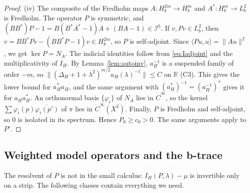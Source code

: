 \documentclass[11pt,oneside,reqno]{article}
\newcommand{\Ib}{\mathcal I^b}
\theoremstyle{plain}
\theoremstyle{definition}
\theoremstyle{remark}
\begin{document}
\begin{proof}
(iv) The composite of the Fredholm maps \(A:H^{2m}_b\to H^m_b\) and
\(A^*:H^m_b\to L^2_b\) is Fredholm. The operator \(P\) is symmetric, and
\((BB^*)P-1=B(B^*A^*-1)A+(BA-1)\in\Ib\). If \(v,Pv\in L^2_b\), then
\(v=BB^*Pv-(BB^*P-1)v\in H^{2m}_b\), so \(P\) is self-adjoint. Since
\(\langle Pu,u\rangle=\|Au\|^2\), we get \(\ker P=N_A\). The indicial
identities follow from \eqref{eq:Iadjoint} and the multiplicativity of
\(I_H\). By Lemma~\ref{lem:autoinv}, \(a_H^{-1}\) is a suspended family of
order \(-m\), so \(\|(\Delta_H+1+\lambda^2)^{m/2}a_H(\lambda)^{-1}\|\leq C\)
on \(\mathbb R\) (C3). This gives the lower bound for \(a_H^*a_H\), and the
same argument with \((a_H^*)^{-1}=(a_H^{-1})^*\) gives it for
\(a_Ha_H^*\). An orthonormal basis \(\{\varphi_i\}\) of \(N_A\) lies in
\(\dot C^\infty\), so the kernel \(\sum\varphi_i(p)\overline{\varphi_i(p')}\)
of \(\pi\) lies in \(\dot C^\infty(X^2)\). Finally, \(P\) is Fredholm and
self-adjoint, so \(0\) is isolated in its spectrum. Hence \(P_0\geq c_0>0\).
The same arguments apply to \(P'\).
\end{proof}

\subsection{Weighted model operators and the b-trace}\label{subsec:Kclass}

The resolvent of \(P\) is not in the small calculus: \(I_H(P,\lambda)-\mu\)
is invertible only on a strip. The following classes contain everything
we need.
\end{document}
